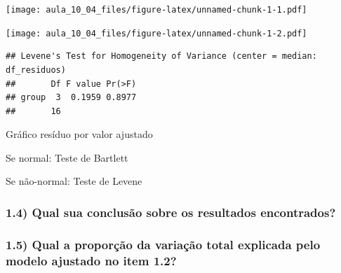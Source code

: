 \documentclass[
  a4paper]{article}
\newenvironment{Shaded}{\begin{snugshade}}{\end{snugshade}}
\newcommand{\AttributeTok}[1]{\textcolor[rgb]{0.77,0.63,0.00}{#1}}
\newcommand{\CommentTok}[1]{\textcolor[rgb]{0.56,0.35,0.01}{\textit{#1}}}
\newcommand{\FunctionTok}[1]{\textcolor[rgb]{0.00,0.00,0.00}{#1}}
\newcommand{\NormalTok}[1]{#1}
\newcommand{\SpecialCharTok}[1]{\textcolor[rgb]{0.00,0.00,0.00}{#1}}
\begin{document}
\texttt{[image: aula\_10\_04\_files/figure-latex/unnamed-chunk-1-1.pdf]}

\begin{Shaded}
\end{Shaded}

\texttt{[image: aula\_10\_04\_files/figure-latex/unnamed-chunk-1-2.pdf]}

\begin{Shaded}
\end{Shaded}

\begin{verbatim}
## Levene's Test for Homogeneity of Variance (center = median: df_residuos)
##       Df F value Pr(>F)
## group  3  0.1959 0.8977
##       16
\end{verbatim}

Gráfico resíduo por valor ajustado

Se normal: Teste de Bartlett

Se não-normal: Teste de Levene

\hypertarget{qual-sua-conclusuxe3o-sobre-os-resultados-encontrados}{%
\subsubsection{1.4) Qual sua conclusão sobre os resultados
encontrados?}\label{qual-sua-conclusuxe3o-sobre-os-resultados-encontrados}}

\hypertarget{qual-a-proporuxe7uxe3o-da-variauxe7uxe3o-total-explicada-pelo-modelo-ajustado-no-item-1.2}{%
\subsubsection{1.5) Qual a proporção da variação total explicada pelo
modelo ajustado no item
1.2?}\label{qual-a-proporuxe7uxe3o-da-variauxe7uxe3o-total-explicada-pelo-modelo-ajustado-no-item-1.2}}
\end{document}
